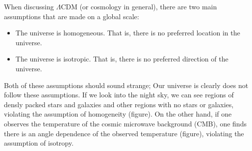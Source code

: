 When discussing $\Lambda$CDM (or cosmology in general), there are two main assumptions that are made on a global scale:
\begin{itemize}
    \item The universe is homogeneous. That is, there is no preferred location in the universe.
    \item The universe is isotropic. That is, there is no preferred direction of the universe.
\end{itemize}
Both of these assumptions should sound strange; Our universe is clearly does not follow these assumptions. If we look into the night sky, we can see regions of densly packed stars and galaxies and other regions with no stars or galaxies, violating the assumption of homogeneity (figure). On the other hand, if one observes the temperature of the cosmic microwave background (CMB), one finds there is an angle dependence of the observed temperature (figure), violating the assumption of isotropy.

